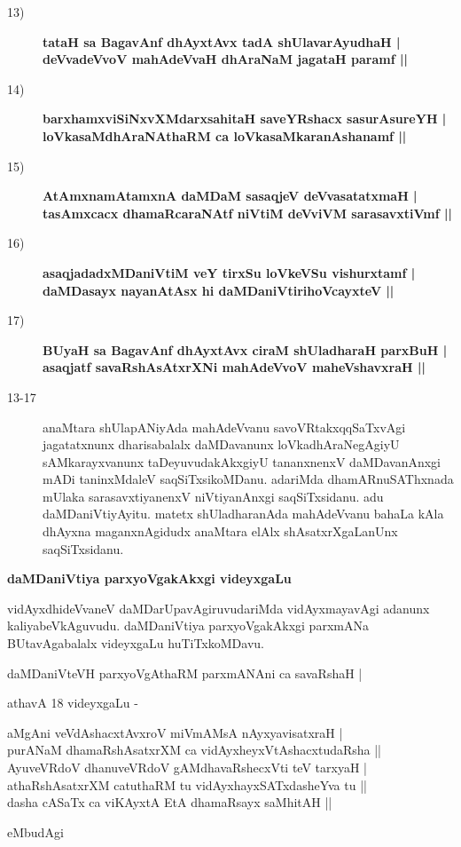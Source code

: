 \begin{description}
\item [13)] {\bf tataH sa BagavAnf dhAyxtAvx tadA shUlavarAyudhaH |\\ deVvadeVvoV mahAdeVvaH dhAraNaM jagataH paramf ||}
\item [14)] {\bf barxhamxviSiNxvXMdarxsahitaH saveYRshacx sasurAsureYH |\\ loVkasaMdhAraNAthaRM ca loVkasaMkaranAshanamf ||}
\item [15)] {\bf AtAmxnamAtamxnA daMDaM sasaqjeV deVvasatatxmaH |\\ tasAmxcacx dhamaRcaraNAtf niVtiM deVviVM sarasavxtiVmf ||}
\item [16)] {\bf asaqjadadxMDaniVtiM veY tirxSu loVkeVSu vishurxtamf |\\ daMDasayx nayanAtAsx hi daMDaniVtirihoVcayxteV ||}
\item [17)] {\bf BUyaH sa BagavAnf dhAyxtAvx ciraM shUladharaH parxBuH |\\ asaqjatf savaRshAsAtxrXNi mahAdeVvoV maheVshavxraH ||}

\item [13-17] anaMtara shUlapANiyAda mahAdeVvanu savoVRtakxqqSaTxvAgi jagatatxnunx dharisabalalx daMDavanunx loVkadhAraNegAgiyU sAMkarayxvanunx taDeyuvudakAkxgiyU tananxnenxV daMDavanAnxgi mADi taninxMdaleV saqSiTxsikoMDanu. adariMda dhamARnuSAThxnada mUlaka sarasavxtiyanenxV niVtiyanAnxgi saqSiTxsidanu. adu daMDaniVtiyAyitu. matetx shUladharanAda mahAdeVvanu bahaLa kAla dhAyxna maganxnAgidudx anaMtara elAlx shAsatxrXgaLanUnx saqSiTxsidanu.
\end{description}

{\noindent
{\large\bf daMDaniVtiya parxyoVgakAkxgi videyxgaLu}}\label{page99}
\medskip

\noindent
vidAyxdhideVvaneV daMDarUpavAgiruvudariMda vidAyxmayavAgi adanunx kaliyabeVkAguvudu. daMDaniVtiya parxyoVgakAkxgi parxmANa BUtavAgabalalx videyxgaLu huTiTxkoMDavu.

\begin{shloka}
daMDaniVteVH parxyoVgAthaRM parxmANAni ca savaRshaH |\label{99}
\end{shloka}

 athavA 18 videyxgaLu -

\begin{shloka}
aMgAni veVdAshacxtAvxroV miVmAMsA nAyxyavisatxraH |\\
purANaM dhamaRshAsatxrXM ca vidAyxheyxVtAshacxtudaRsha ||\\
AyuveVRdoV dhanuveVRdoV gAMdhavaRshecxVti teV tarxyaH |\\
athaRshAsatxrXM catuthaRM tu vidAyxhayxSATxdasheYva tu ||\\
dasha cASaTx ca viKAyxtA EtA dhamaRsayx saMhitAH ||
\end{shloka}
 eMbudAgi
 
